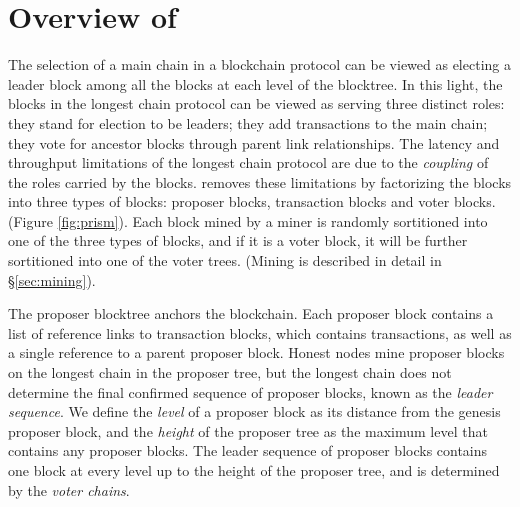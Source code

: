 
\section{Overview of \prism}
\label{sec:overview}


The selection of a main chain in a blockchain protocol can be viewed as electing a leader block among all the blocks at each level of the blocktree. In this light, the blocks in the longest chain protocol can be viewed as serving three distinct roles: they stand for election to be leaders;  they add transactions to the main chain; they vote for ancestor blocks through parent link relationships. The latency and throughput limitations of the longest chain protocol are due to the {\em coupling} of the roles carried by the blocks. \prism removes these limitations by factorizing the blocks into three types of blocks: proposer blocks, transaction blocks and voter blocks. (Figure \ref{fig:prism}). Each block mined by a miner is randomly sortitioned into one of the three types of blocks, and if it is a voter block, it will be further  sortitioned into one of the voter trees. (Mining is described in detail in \S\ref{sec:mining}).

The proposer blocktree anchors the \prism blockchain. 
Each proposer block contains a list of reference links to transaction blocks, which contains transactions, as well as a single reference to a parent proposer block.
Honest nodes mine proposer blocks on the longest chain in the proposer tree, but the longest chain does not determine the final confirmed sequence of proposer blocks, known as the  \emph{leader sequence}. 
We define the \emph{level} of a proposer block as its distance from the genesis proposer block, and the \emph{height} of the proposer tree as the maximum level that contains any proposer blocks. 
The leader sequence of proposer blocks contains one block at every level up to the height of the proposer tree, and is  determined by the \emph{voter chains}. 


